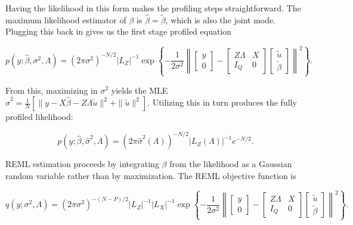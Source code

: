 \documentclass[article,shortnames]{jss}
\begin{document}
Having the likelihood in this form makes the profiling steps straightforward. The maximum
likelihood estimator of $\beta$ is $\hat\beta = \tilde{\beta}$, which
is also the joint mode. Plugging this back in gives us the first stage
profiled equation

\begin{equation*}
  p(y; \hat\beta, \sigma^2, \Lambda) = (2\pi\sigma^2)^{-N/2}|L_Z|^{-1} 
  \exp\left\{-\frac{1}{2\sigma^2} \left\| \begin{bmatrix} y \\
        0 \end{bmatrix} - \begin{bmatrix} Z \Lambda & X \\ I_Q & 0 \end{bmatrix}
      \begin{bmatrix} \tilde{u} \\ \tilde{\beta} \end{bmatrix} \right\|^2\right\}.
\end{equation*}
  
From this, maximizing in $\sigma^2$ yields the MLE $\hat{\sigma}^2 = \frac{1}{N}\left[ \|y - X\hat{\beta}
  - Z\Lambda \tilde{u} \|^2 + \|\tilde{u}\|^2\right]$. Utilizing this in turn produces the fully profiled likelihood:

\begin{equation}
  p(y;\hat{\beta}, \hat{\sigma}^2, \Lambda) = \left(2\pi
  \hat{\sigma}^2(\Lambda)\right)^{-N/2} |L_Z(\Lambda)|^{-1}e^{-N/2}.
\label{eq:profiledLikelihood}
\end{equation}

REML estimation proceeds by integrating $\beta$ from the likelihood as a Gaussian
random variable rather than by maximization. The REML objective function is

\begin{equation}
  q(y; \sigma^2, \Lambda) = (2\pi\sigma^2)^{-(N-P)/2}
  |L_Z|^{-1}|L_X|^{-1} \exp\left\{-\frac{1}{2\sigma^2}
    \left\|\begin{bmatrix} y \\ 0 \end{bmatrix} - \begin{bmatrix}
        Z\Lambda & X \\ I_Q & 0 \end{bmatrix} \begin{bmatrix} \tilde{u} \\ 
        \tilde{\beta} \end{bmatrix} \right\|^2\right\}.
\end{equation}
\end{document}
